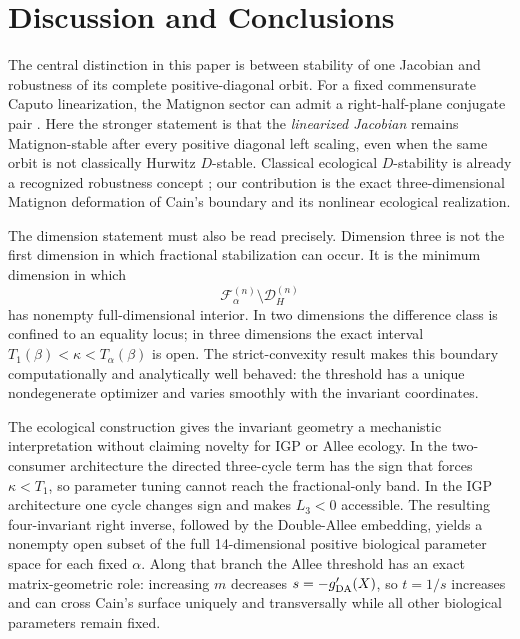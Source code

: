 \section{Discussion and Conclusions}\label{sec:discussion}

The central distinction in this paper is between stability of one Jacobian and robustness of its complete positive-diagonal orbit. For a fixed commensurate Caputo linearization, the Matignon sector can admit a right-half-plane conjugate pair \cite{Matignon1996,BrandiburGarrappaKaslik2021}. Here the stronger statement is that the \emph{linearized Jacobian} remains Matignon-stable after every positive diagonal left scaling, even when the same orbit is not classically Hurwitz \(D\)-stable. Classical ecological \(D\)-stability is already a recognized robustness concept \cite{ChenWangLiu2024}; our contribution is the exact three-dimensional Matignon deformation of Cain's boundary and its nonlinear ecological realization.

The dimension statement must also be read precisely. Dimension three is not the first dimension in which fractional stabilization can occur. It is the minimum dimension in which
\[
\mathcal F_\alpha^{(n)}\setminus\mathcal D_H^{(n)}
\]
has nonempty full-dimensional interior. In two dimensions the difference class is confined to an equality locus; in three dimensions the exact interval \(T_1(\beta)<\kappa<T_\alpha(\beta)\) is open. The strict-convexity result makes this boundary computationally and analytically well behaved: the threshold has a unique nondegenerate optimizer and varies smoothly with the invariant coordinates.

The ecological construction gives the invariant geometry a mechanistic interpretation without claiming novelty for IGP or Allee ecology. In the two-consumer architecture the directed three-cycle term has the sign that forces \(\kappa<T_1\), so parameter tuning cannot reach the fractional-only band. In the IGP architecture one cycle changes sign and makes \(L_3<0\) accessible. The resulting four-invariant right inverse, followed by the Double-Allee embedding, yields a nonempty open subset of the full 14-dimensional positive biological parameter space for each fixed \(\alpha\). Along that branch the Allee threshold has an exact matrix-geometric role: increasing \(m\) decreases \(s=-g'_{\rm DA}(X)\), so \(t=1/s\) increases and can cross Cain's surface uniquely and transversally while all other biological parameters remain fixed.

